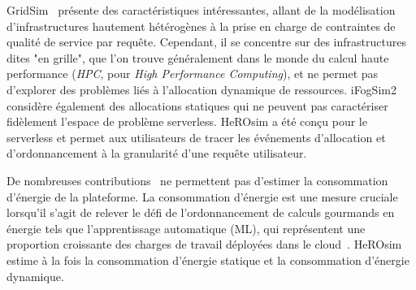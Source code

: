 
GridSim~\cite{buyyaGridSimToolkitModeling2002} présente des caractéristiques intéressantes, allant de la modélisation d'infrastructures hautement hétérogènes à la prise en charge de contraintes de qualité de service par requête. Cependant, il se concentre sur des infrastructures dites "en grille", que l'on trouve généralement dans le monde du calcul haute performance (\textit{HPC}, pour \textit{High Performance Computing}), et ne permet pas d'explorer des problèmes liés à l'allocation dynamique de ressources. iFogSim2~\cite{mahmudIFogSim2ExtendedIFogSim2021} considère également des allocations statiques qui ne peuvent pas caractériser fidèlement l'espace de problème serverless.
HeROsim a été conçu pour le serverless et permet aux utilisateurs de tracer les événements d'allocation et d'ordonnancement à la granularité d'une requête utilisateur.

De nombreuses contributions~\cite{jeonCloudSimExtensionSimulatingDistributed2019, cai_elasticsim_2017, buyyaGridSimToolkitModeling2002, nunez_icancloud_2012} ne permettent pas d'estimer la consommation d'énergie de la plateforme. La consommation d'énergie est une mesure cruciale lorsqu'il s'agit de relever le défi de l'ordonnancement de calculs gourmands en énergie tels que l'apprentissage automatique (ML), qui représentent une proportion croissante des charges de travail déployées dans le cloud~\cite{masanetRecalibratingGlobalData2020}.
HeROsim estime à la fois la consommation d'énergie statique et la consommation d'énergie dynamique.

